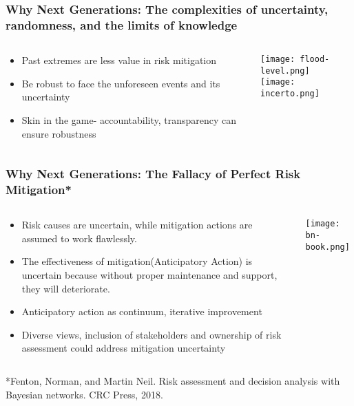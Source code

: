\documentclass{beamer}
\begin{document}
\begin{frame}
	\frametitle{Why Next Generations: The complexities of uncertainty, randomness, and the limits of knowledge}
	\begin{columns}
		
		\begin{column}{0.8\textwidth}
			\begin{itemize}
				\item Past extremes are less value in risk mitigation
				\item Be robust to face the unforeseen events and its uncertainty
				\item Skin in the game- accountability, transparency can ensure robustness  
			\end{itemize}
		\end{column}
		
	\begin{column}{0.5\textwidth}
		\texttt{[image: flood-level.png]} \\
		\vspace{0.2cm}
		\texttt{[image: incerto.png]} \\
	\end{column}
		
	\end{columns}
\end{frame}

\begin{frame}
	\frametitle{Why Next Generations: The Fallacy of Perfect Risk Mitigation*}
	\begin{columns}
		
		\begin{column}{0.8\textwidth}
			\begin{itemize}
				\item Risk causes are uncertain, while mitigation actions are assumed to work flawlessly. 
				\item The effectiveness of mitigation(Anticipatory Action) is uncertain because without proper maintenance and support, they will deteriorate.
				\item Anticipatory action as continuum, iterative improvement 
				\item Diverse views, inclusion of stakeholders and ownership of risk assessment could address mitigation uncertainty 
			\end{itemize}
		\end{column}
		
		\begin{column}{0.3\textwidth}
			\texttt{[image: bn-book.png]} \\
		\end{column}
	
	\end{columns}
 \vspace{1em}
 \footnotesize{*Fenton, Norman, and Martin Neil. Risk assessment and decision analysis with Bayesian networks. CRC Press, 2018.}	
\end{frame}
\end{document}
